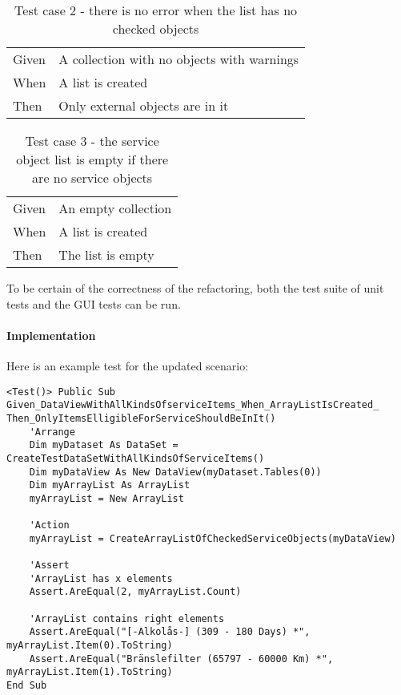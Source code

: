 \documentclass{article}
\begin{document}
				\begin{table}[h!]
					\centering
					\begin{tabular}{|p{1cm} p{7cm} |}
					\hline
					Given 	& A collection with no objects with warnings\\ 
					When 	& A list is created  \\	
					Then 	& Only external objects are in it \\
					\hline
					\end{tabular}
					\caption{Test case 2 - there is no error when the list has no checked objects}
				\end{table}


				\begin{table}[h!]
					\centering
					\begin{tabular}{|p{1cm} p{7cm} |}
					\hline
					Given 	& An empty collection \\ 
					When 	& A list is created  \\	
					Then 	& The list is empty \\
					\hline
					\end{tabular}
					\caption{Test case 3 - the service object list is empty if there are no service objects}
				\end{table}

				To be certain of the correctness of the refactoring, both the test suite of unit tests and the GUI tests can be run.

				\paragraph{Implementation}
				Here is an example test for the updated scenario:

				\begin{lstlisting}
<Test()> Public Sub Given_DataViewWithAllKindsOfserviceItems_When_ArrayListIsCreated_
Then_OnlyItemsElligibleForServiceShouldBeInIt()
	'Arrange
	Dim myDataset As DataSet = CreateTestDataSetWithAllKindsOfServiceItems()
	Dim myDataView As New DataView(myDataset.Tables(0))
	Dim myArrayList As ArrayList
	myArrayList = New ArrayList

	'Action
	myArrayList = CreateArrayListOfCheckedServiceObjects(myDataView)

	'Assert
	'ArrayList has x elements
	Assert.AreEqual(2, myArrayList.Count)

	'ArrayList contains right elements
	Assert.AreEqual("[-Alkolås-] (309 - 180 Days) *", myArrayList.Item(0).ToString)
	Assert.AreEqual("Bränslefilter (65797 - 60000 Km) *", myArrayList.Item(1).ToString)
End Sub
				\end{lstlisting}
\end{document}
